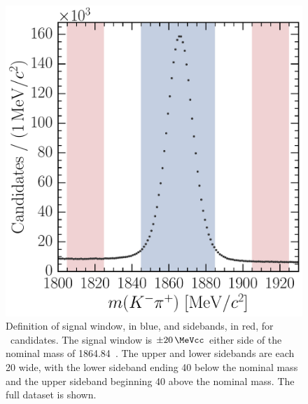 \begin{figure}
  \centering
  \includegraphics[width=\textwidth]{figures/production/fitting/D0ToKpi_mass_offline_selection_regions}
  \caption{%
    Definition of signal window, in blue, and sidebands, in red, for \DzToKpi\ 
    candidates.
    The signal window is $\pm\SI{20}{\MeVcc}$ either side of the nominal 
    \PDzero mass of \SI{1864.84}{\MeVcc}~\cite{PDG2014}.
    The upper and lower sidebands are each \SI{20}{\MeVcc} wide, with the lower 
    sideband ending \SI{40}{\MeVcc} below the nominal \PDzero mass and the 
    upper sideband beginning \SI{40}{\MeVcc} above the nominal \PDzero mass.
    The full dataset is shown.
  }
  \label{fig:prod:fitting:regions:D0ToKpi}
\end{figure}

